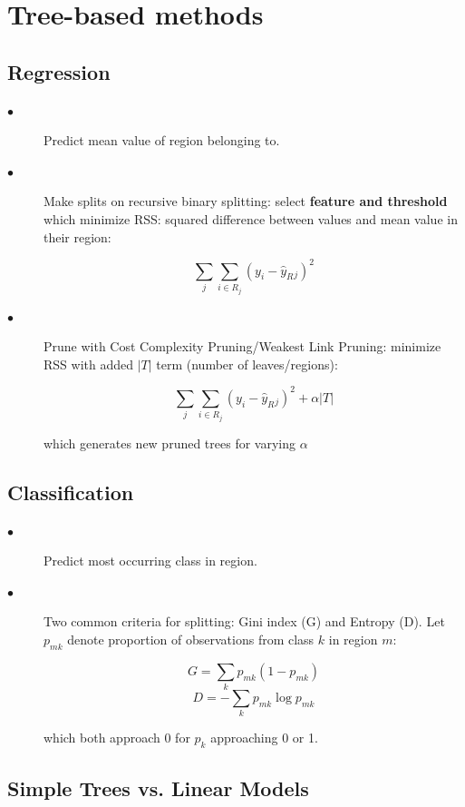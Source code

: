 \documentclass{article}
\begin{document}
\section{Tree-based methods}
\subsection{Regression}

\begin{description}

  \item[$\bullet$] Predict mean value of region belonging to.
  
    \item[$\bullet$] Make splits on recursive binary splitting: select \textbf{feature and threshold} which minimize RSS: squared difference between values and mean value in their region:
    
    \[\sum_j \sum_{i \in R_j} (y_i - \hat{y}_R{_j})^2\]
  
    \item[$\bullet$] Prune with Cost Complexity Pruning/Weakest Link Pruning: minimize RSS with added $|T|$ term (number of leaves/regions):
    
    \[\sum_j \sum_{i \in R_j} (y_i - \hat{y}_R{_j})^2 + \alpha|T|\]
    
    which generates new pruned trees for varying $\alpha$
\end{description}

\subsection{Classification}

\begin{description}

  \item[$\bullet$] Predict most occurring class in region.

  \item[$\bullet$] Two common criteria for splitting: Gini index (G) and Entropy (D). Let $p_{mk}$ denote proportion of observations from class $k$ in region $m$:
 
  \[G = \sum_k p_{mk}(1-p_{mk})\]
  \[D = -\sum_k p_{mk}\log p_{mk}\]
  
  which both approach 0 for $p_k$ approaching 0 or 1.

\end{description}

\subsection{Simple Trees vs. Linear Models}
\end{document}
